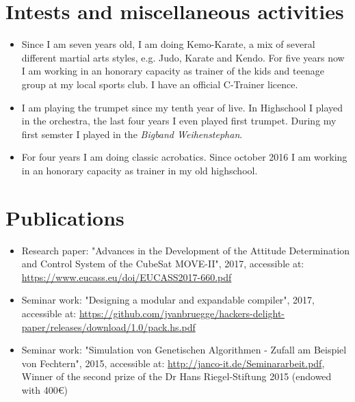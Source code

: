 \documentclass[11pt,a4paper,sans]{moderncv}        %
\begin{document}
\section{Intests and miscellaneous activities}

\vspace{5pt}

\begin{itemize}

\item{Since I am seven years old, I am doing Kemo-Karate, a mix of several different martial arts styles, e.g. Judo, Karate and Kendo. For five years now I am working in an honorary capacity as trainer of the kids and teenage group at my local sports club. I have an official C-Trainer licence.}

\vspace{3pt}

\item{I am playing the trumpet since my tenth year of live. In Highschool I played in the orchestra, the last four years I even played first trumpet. During my first semster I played in the \textit{Bigband Weihenstephan}.}

\vspace{3pt}

\item{For four years I am doing classic acrobatics. Since october 2016 I am working in an honorary capacity as trainer in my old highschool.}

\end{itemize}

\section{Publications}

\vspace{5pt}

\begin{itemize}
\item{Research paper: "Advances in the Development of the Attitude Determination and Control System of the CubeSat MOVE-II", 2017, accessible at: \url{https://www.eucass.eu/doi/EUCASS2017-660.pdf}}

\vspace{3pt}

\item{Seminar work: "Designing a modular and expandable compiler", 2017, accessible at: \url{https://github.com/jvanbruegge/hackers-delight-paper/releases/download/1.0/pack.hs.pdf}}

\vspace{3pt}

\item{Seminar work: "Simulation von Genetischen Algorithmen - Zufall am Beispiel von Fechtern", 2015, accessible at: \url{http://janco-it.de/Seminararbeit.pdf}, Winner of the second prize of the Dr Hans Riegel-Stiftung 2015 (endowed with 400\euro)}

\end{itemize}
\end{document}
